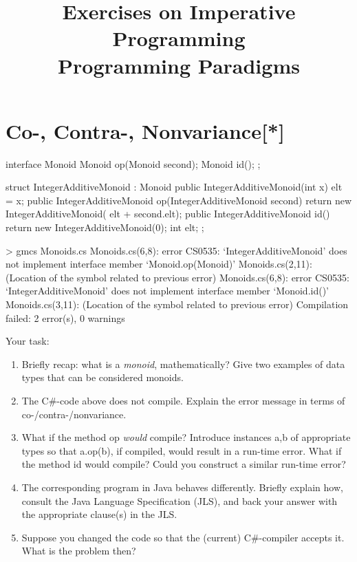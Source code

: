 \documentclass{article}
\begin{document}
\title{Exercises on Imperative Programming\\
  \large Programming Paradigms}
\date{}

\maketitle



\section{Co-, Contra-, Nonvariance[*]}

\begin{java}
interface Monoid {
   Monoid op(Monoid second);
   Monoid id();
};

struct IntegerAdditiveMonoid : Monoid {
    public IntegerAdditiveMonoid(int x) { 
         elt = x;
    }    
    public IntegerAdditiveMonoid op(IntegerAdditiveMonoid second) { 
         return new IntegerAdditiveMonoid(
             elt + second.elt); 
    }
    public IntegerAdditiveMonoid id(){ 
         return new IntegerAdditiveMonoid(0);
    }
    int elt;
};

> gmcs Monoids.cs 
Monoids.cs(6,8): error CS0535: `IntegerAdditiveMonoid' does not implement 
  interface member `Monoid.op(Monoid)'
Monoids.cs(2,11): (Location of the symbol related to previous error)
Monoids.cs(6,8): error CS0535: `IntegerAdditiveMonoid' does not implement 
  interface member `Monoid.id()'
Monoids.cs(3,11): (Location of the symbol related to previous error)
Compilation failed: 2 error(s), 0 warnings

\end{java}
%
Your task:
\begin{enumerate}
\item Briefly recap: what is a \textit{monoid}, mathematically? Give two examples
of data types that can be considered monoids.
\item The C\#-code above does not compile. Explain the error message
in terms of co-/contra-/nonvariance.
\item What if the method \textsf{op} \textit{would} compile? 
Introduce instances \textsf{a,b} of appropriate types so that
\textsf{a.op(b)}, if compiled, would result in a run-time error.
What if the method 
\textsf{id} would compile? Could you construct a similar run-time
error? 
\item The corresponding program in Java behaves differently. Briefly
explain how, consult the Java Language Specification (JLS), and back your answer
with the appropriate clause(s) in the JLS.
\item Suppose you changed the code so that 
the (current) C\#-compiler accepts it. What is the problem then? 
\end{enumerate}
\end{document}
